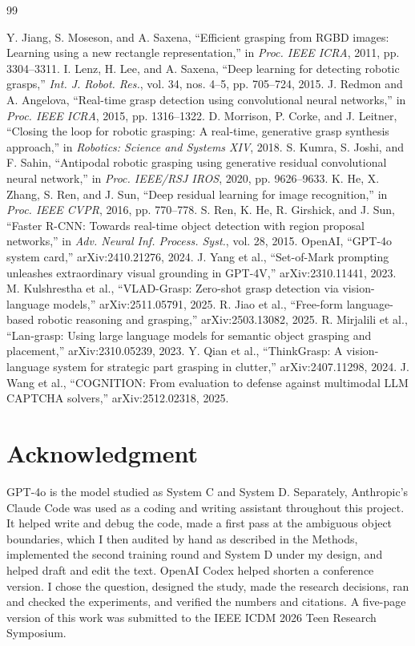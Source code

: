 \documentclass[12pt,letterpaper]{article}
\begin{document}
\newpage
\begin{thebibliography}{99}
 Y. Jiang, S. Moseson, and A. Saxena, ``Efficient grasping from RGBD images: Learning using a new rectangle representation,'' in \emph{Proc. IEEE ICRA}, 2011, pp. 3304--3311.
 I. Lenz, H. Lee, and A. Saxena, ``Deep learning for detecting robotic grasps,'' \emph{Int. J. Robot. Res.}, vol. 34, nos. 4--5, pp. 705--724, 2015.
 J. Redmon and A. Angelova, ``Real-time grasp detection using convolutional neural networks,'' in \emph{Proc. IEEE ICRA}, 2015, pp. 1316--1322.
 D. Morrison, P. Corke, and J. Leitner, ``Closing the loop for robotic grasping: A real-time, generative grasp synthesis approach,'' in \emph{Robotics: Science and Systems XIV}, 2018.
 S. Kumra, S. Joshi, and F. Sahin, ``Antipodal robotic grasping using generative residual convolutional neural network,'' in \emph{Proc. IEEE/RSJ IROS}, 2020, pp. 9626--9633.
 K. He, X. Zhang, S. Ren, and J. Sun, ``Deep residual learning for image recognition,'' in \emph{Proc. IEEE CVPR}, 2016, pp. 770--778.
 S. Ren, K. He, R. Girshick, and J. Sun, ``Faster R-CNN: Towards real-time object detection with region proposal networks,'' in \emph{Adv. Neural Inf. Process. Syst.}, vol. 28, 2015.
 OpenAI, ``GPT-4o system card,'' arXiv:2410.21276, 2024.
 J. Yang et al., ``Set-of-Mark prompting unleashes extraordinary visual grounding in GPT-4V,'' arXiv:2310.11441, 2023.
 M. Kulshrestha et al., ``VLAD-Grasp: Zero-shot grasp detection via vision-language models,'' arXiv:2511.05791, 2025.
 R. Jiao et al., ``Free-form language-based robotic reasoning and grasping,'' arXiv:2503.13082, 2025.
 R. Mirjalili et al., ``Lan-grasp: Using large language models for semantic object grasping and placement,'' arXiv:2310.05239, 2023.
 Y. Qian et al., ``ThinkGrasp: A vision-language system for strategic part grasping in clutter,'' arXiv:2407.11298, 2024.
 J. Wang et al., ``COGNITION: From evaluation to defense against multimodal LLM CAPTCHA solvers,'' arXiv:2512.02318, 2025.
\end{thebibliography}

\section*{Acknowledgment}

GPT-4o is the model studied as System C and System D. Separately,
Anthropic's Claude Code was used as a coding and writing assistant
throughout this project. It helped write and debug the code, made a first
pass at the ambiguous object boundaries, which I then audited by hand as
described in the Methods, implemented the second training round and System
D under my design, and helped draft and edit the text. OpenAI Codex helped
shorten a conference version. I chose the question, designed the study,
made the research decisions, ran and checked the experiments, and verified
the numbers and citations. A five-page version of this work was submitted
to the IEEE ICDM 2026 Teen Research Symposium.
\end{document}
